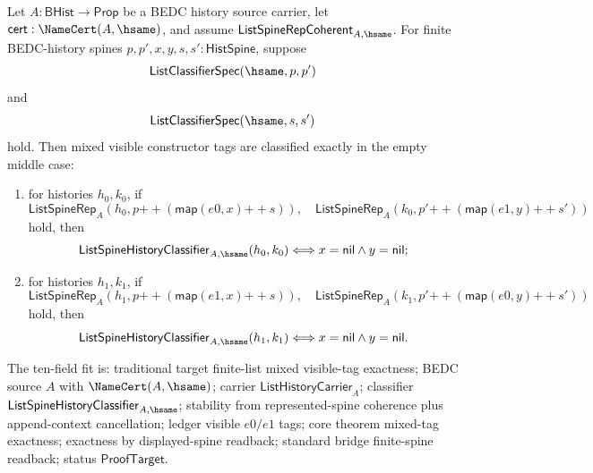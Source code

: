 \begin{theorem}
\label{thm:list-represented-spine-mixed-tag-context-exactness}
Let $A:\mathsf{BHist}\to\mathsf{Prop}$ be a BEDC history source carrier, let
$\mathsf{cert}:\NameCert(A,\hsame)$, and assume
$\mathsf{ListSpineRepCoherent}_{A,\hsame}$. For finite BEDC-history spines
$p,p',x,y,s,s':\mathsf{HistSpine}$, suppose
$$
\mathsf{ListClassifierSpec}(\hsame,p,p')
$$
and
$$
\mathsf{ListClassifierSpec}(\hsame,s,s')
$$
hold. Then mixed visible constructor tags are classified exactly in the empty
middle case:
\begin{enumerate}
  \item for histories $h_0,k_0$, if
  $$
  \mathsf{ListSpineRep}_A(h_0,p{++}(\mathsf{map}(e0,x){++}s)),
  \quad
  \mathsf{ListSpineRep}_A(k_0,p'{++}(\mathsf{map}(e1,y){++}s'))
  $$
  hold, then
  $$
  \mathsf{ListSpineHistoryClassifier}_{A,\hsame}(h_0,k_0)
  \Longleftrightarrow
  x=\mathsf{nil}\land y=\mathsf{nil};
  $$
  \item for histories $h_1,k_1$, if
  $$
  \mathsf{ListSpineRep}_A(h_1,p{++}(\mathsf{map}(e1,x){++}s)),
  \quad
  \mathsf{ListSpineRep}_A(k_1,p'{++}(\mathsf{map}(e0,y){++}s'))
  $$
  hold, then
  $$
  \mathsf{ListSpineHistoryClassifier}_{A,\hsame}(h_1,k_1)
  \Longleftrightarrow
  x=\mathsf{nil}\land y=\mathsf{nil}.
  $$
\end{enumerate}

The ten-field fit is: traditional target finite-list mixed visible-tag
exactness; BEDC source $A$ with $\NameCert(A,\hsame)$; carrier
$\mathsf{ListHistoryCarrier}_A$; classifier
$\mathsf{ListSpineHistoryClassifier}_{A,\hsame}$; stability from
represented-spine coherence plus append-context cancellation; ledger visible
$e0/e1$ tags; core theorem mixed-tag exactness; exactness by displayed-spine
readback; standard bridge finite-spine readback; status $\mathsf{ProofTarget}$.
\end{theorem}
